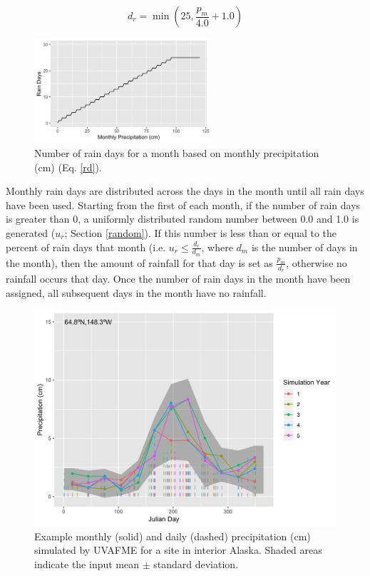 \documentclass[a4paper, 12pt] {report}
\begin{document}
\begin{equation}\label{rd}
d_r = \min{(25, \frac{p_m}{4.0} + 1.0)}
\end{equation}

\begin{figure}
  \includegraphics[width=0.58\textwidth]{Figures/RainDays.png}
  \caption{Number of rain days for a month based on monthly precipitation (cm) (Eq. \ref{rd}).}
  \label{fig:raindays}
\end{figure}

Monthly rain days are distributed across the days in the month until all rain days have been used. Starting from the first of each month, if the number of rain days is greater than 0, a uniformly distributed random number between 0.0 and 1.0 is generated ($u_r$; Section \ref{random}). If this number is less than or equal to the percent of rain days that month (i.e. $u_r \leq{\frac{d_r}{d_m}}$, where $d_m$ is the number of days in the month), then the amount of rainfall for that day is set as $\frac{p_m}{d_r}$, otherwise no rainfall occurs that day. Once the number of rain days in the month have been assigned, all subsequent days in the month have no rainfall.

\begin{figure}
  \includegraphics[width=0.8\linewidth]{Figures/Precipitation_Daily.png}
  \caption{Example monthly (solid) and daily (dashed) precipitation (cm) simulated by UVAFME for a site in interior Alaska. Shaded areas indicate the input mean $\pm$ standard deviation.}
  \label{fig:dailyprecip}
\end{figure}
\end{document}
